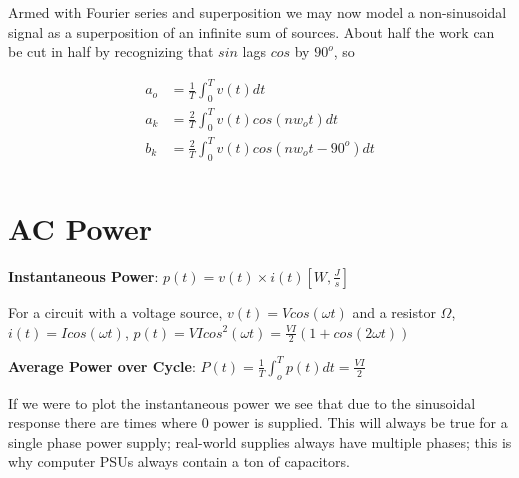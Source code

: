 \documentclass[../notes.tex]{subfiles}
\begin{document}
Armed with Fourier series and superposition we may now model a non-sinusoidal signal as a superposition of an infinite sum of sources. About half the work can be cut in half by recognizing that $ sin $ lags $ cos $ by $ 90^o $, so


\begin{equation}
	\begin{split}
		a_o &=  \frac{1}{T} \int^T_0 v(t) dt \\
		a_k &= \frac{2}{T} \int^T_0 v(t) cos (nw_o t) dt \\
		b_k &= \frac{2}{T} \int^T_0 v(t) cos(nw_o t - 90^o) dt \\
	\end{split}
\end{equation}

\section{AC Power}

\begin{definition}
	\textbf{Instantaneous Power}: $ p(t) = v(t) \times i(t) [W, \frac{J}{s}]$  

	\begin{example}
		For a circuit with a voltage source, $ v(t) = Vcos(\omega t) $ and a resistor $ \Omega $, $ i(t) = Icos(\omega t) $, $ p(t) = VI cos^2 (\omega t) = \frac{VI}{2}(1+cos(2\omega t))$
	\end{example}
	
\end{definition}

\begin{definition}
	\textbf{Average Power over Cycle}: $ P(t) = \frac{1}{T} \int_o^T p(t) dt = \frac{VI}{2} $  
\end{definition}

If we were to plot the instantaneous power we see that due to the sinusoidal response there are times where $ 0 $ power is supplied.
This will always be true for a single phase power supply; real-world supplies always have multiple phases; this is why computer PSUs always contain a ton of capacitors.
\end{document}
